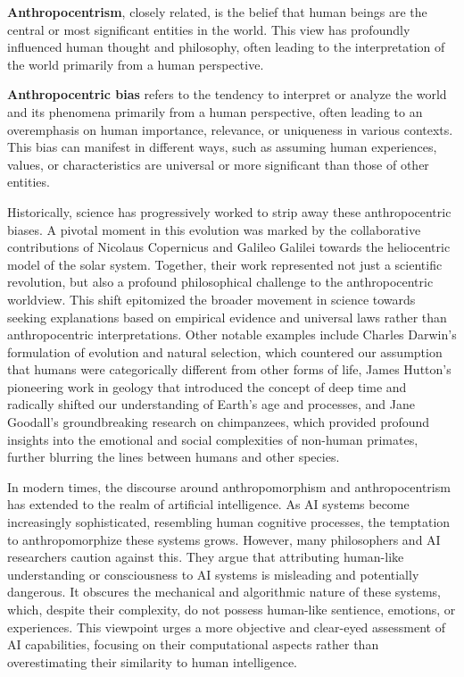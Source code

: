 \documentclass{article}
\begin{document}
\textbf{Anthropocentrism}, closely related, is the belief that human beings are the central or most significant entities in the world. 
This view has profoundly influenced human thought and philosophy, often leading to the interpretation of the world primarily from a human perspective.\par 

\textbf{Anthropocentric bias} refers to the tendency to interpret or analyze the world and its phenomena primarily from a human perspective, often leading to an overemphasis on human importance, relevance, or uniqueness in various contexts. 
This bias can manifest in different ways, such as assuming human experiences, values, or characteristics are universal or more significant than those of other entities.\par

Historically, science has progressively worked to strip away these anthropocentric biases. 
A pivotal moment in this evolution was marked by the collaborative contributions of Nicolaus Copernicus and Galileo Galilei towards the heliocentric model of the solar system\cite{}. 
Together, their work represented not just a scientific revolution, but also a profound philosophical challenge to the anthropocentric worldview\cite{theMetaphysicsBookWeRead}. 
This shift epitomized the broader movement in science towards seeking explanations based on empirical evidence and universal laws rather than anthropocentric interpretations.
Other notable examples include Charles Darwin's formulation of evolution and natural selection, which countered our assumption that humans were categorically different from other forms of life\cite{}, James Hutton's pioneering work in geology that introduced the concept of deep time and radically shifted our understanding of Earth's age and processes\cite{}, and Jane Goodall's groundbreaking research on chimpanzees, which provided profound insights into the emotional and social complexities of non-human primates, further blurring the lines between humans and other species\cite{}.\par

In modern times, the discourse around anthropomorphism and anthropocentrism has extended to the realm of artificial intelligence. 
As AI systems become increasingly sophisticated, resembling human cognitive processes, the temptation to anthropomorphize these systems grows. 
However, many philosophers and AI researchers caution against this. 
They argue that attributing human-like understanding or consciousness to AI systems is misleading and potentially dangerous. It obscures the mechanical and algorithmic nature of these systems, which, despite their complexity, do not possess human-like sentience, emotions, or experiences. This viewpoint urges a more objective and clear-eyed assessment of AI capabilities, focusing on their computational aspects rather than overestimating their similarity to human intelligence.
\end{document}
